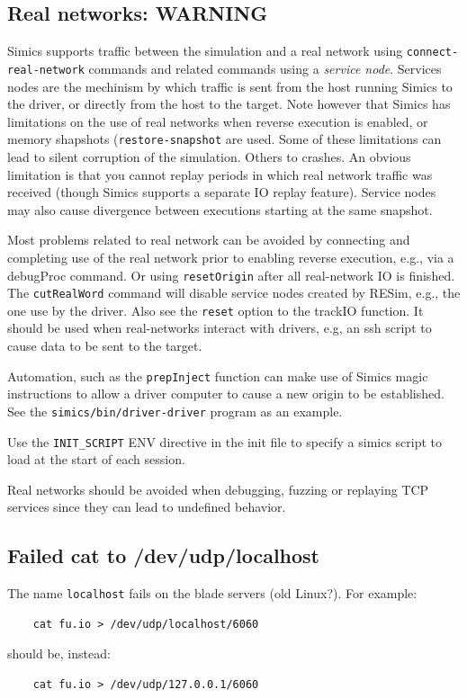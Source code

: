 \documentclass[titlepage]{article}
\begin{document}
\begin{appendices}
\subsection{Real networks: WARNING}
\label{real-networks}
Simics supports traffic between the simulation and a real network using {\tt connect-real-network} commands and related commands using a \textit{service node}.
Services nodes are the mechinism by which traffic is sent from the host running Simics to the driver, or directly from the host to the target.
Note however that Simics has limitations on the use of real networks when reverse execution is enabled, or memory shapshots ({\tt restore-snapshot} are used.  
Some of these limitations can lead to silent corruption
of the simulation.  Others to crashes.  An obvious limitation is that you cannot replay periods in which real network traffic was received (though Simics supports a separate IO replay feature).  Service nodes may also cause divergence between executions starting at the same snapshot.

Most problems related to real network can be avoided by connecting and completing use of the real network prior to enabling reverse execution, e.g., via a debugProc command.  Or using
{\tt resetOrigin} after all real-network IO is finished.  The {\tt cutRealWord} command will disable service nodes created by RESim, e.g., the one use by the driver.  
Also see the {\tt reset} option to the trackIO function.  It should be used when real-networks interact with drivers, e.g, an ssh
script to cause data to be sent to the target.

Automation, such as the {\tt prepInject} function can make use of Simics magic instructions to allow a driver computer to cause a new origin
to be established.  See the {\tt simics/bin/driver-driver} program as an example.

Use the {\tt INIT\_SCRIPT} ENV directive in the init file to specify a simics script to load at the start of each session.

Real networks should be avoided when debugging, fuzzing or replaying TCP services since they can lead to undefined behavior.

\subsection{Failed cat to /dev/udp/localhost}
The name {\tt localhost} fails on the blade servers (old Linux?).   For example:
\begin{verbatim}
    cat fu.io > /dev/udp/localhost/6060
\end{verbatim}
\noindent should be, instead:
\begin{verbatim}
    cat fu.io > /dev/udp/127.0.0.1/6060
\end{verbatim}


\end{appendices}
\end{document}
